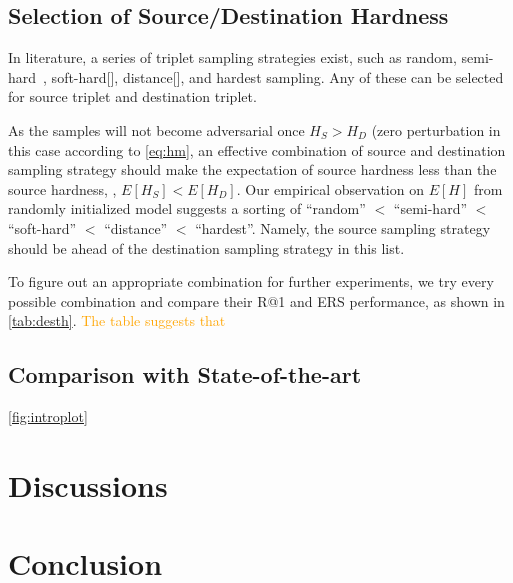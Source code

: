 \documentclass[10pt,twocolumn,letterpaper]{article}
\newcommand{\oo}[1]{\textcolor{orange}{#1}}
\begin{document}
\subsection{Selection of Source/Destination Hardness}



In literature, a series of triplet sampling strategies exist, such as random,
semi-hard~\cite{facenet}, soft-hard[], distance[], and hardest sampling.
%
Any of these can be selected for source triplet and destination triplet.

As the samples will not become adversarial once $H_S>H_D$ (zero perturbation in
this case according to \cref{eq:hm}, an effective combination of source and
destination sampling strategy should make the expectation of source hardness
less than the source hardness, \ie, $E[H_S]<E[H_D]$.
%
Our empirical observation on $E[H]$ from randomly initialized
model suggests a sorting of ``random'' $<$ ``semi-hard'' $<$ ``soft-hard'' $<$
``distance'' $<$ ``hardest''.
%
Namely, the source sampling strategy should be ahead of the destination
sampling strategy in this list.

To figure out an appropriate combination for further experiments, we try
every possible combination and compare their R@1 and ERS performance, as
shown in \cref{tab:desth}.
%
\oo{The table suggests that}

\subsection{Comparison with State-of-the-art}

\cref{fig:introplot}

\section{Discussions}
\label{sec:5}



\section{Conclusion}
\label{sec:6}

\cite{Authors14}

{\small


}


\end{document}
